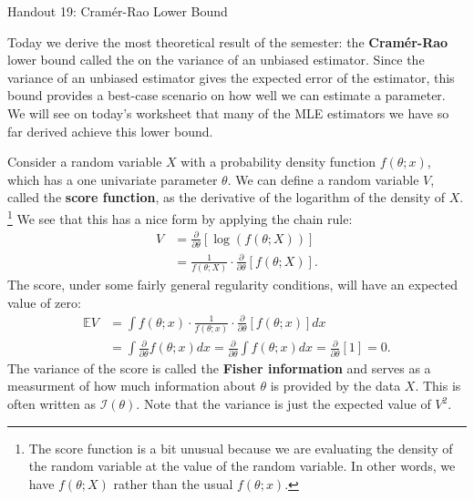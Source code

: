 \documentclass{tufte-handout}
\begin{document}
\justify

{\LARGE Handout 19: Cramér-Rao Lower Bound}

\vspace*{18pt}

\noindent
Today we derive the most theoretical result of the semester: the
\textbf{Cramér-Rao} lower bound called the on the variance of an
unbiased estimator. Since the variance of an unbiased estimator
gives the expected error of the estimator, this bound provides a
best-case scenario on how well we can estimate a parameter. We
will see on today's worksheet that many of the MLE estimators we
have so far derived achieve this lower bound.

Consider a random variable $X$ with a probability density function 
$f(\theta; x)$, which has a one univariate parameter $\theta$. We
can define a random variable $V$, called the \textbf{score function},
as the derivative of the logarithm of the density of $X$. \footnote{
  The score function is a bit unusual because we are evaluating the
  density of the random variable at the value of the random variable.
  In other words, we have $f(\theta; X)$ rather than the usual $f(\theta; x)$. 
} We see that this has a nice form by applying the chain rule:
\begin{align*}
V &= \frac{\partial}{\partial \theta} \left[ \log(f(\theta; X)) \right] \\
&= \frac{1}{f(\theta; X)} \cdot \frac{\partial}{\partial \theta} \left[ f(\theta; X) \right].
\end{align*}
The score, under some fairly general regularity conditions, will have an
expected value of zero:
\begin{align*}
\mathbb{E} V &= \int f(\theta; x) \cdot \frac{1}{f(\theta; x)} \cdot \frac{\partial}{\partial \theta} \left[ f(\theta; x) \right] dx \\
&= \int \frac{\partial}{\partial \theta} f(\theta; x) dx =
\frac{\partial}{\partial \theta} \int f(\theta; x) dx = \frac{\partial}{\partial \theta} \left[1\right] = 0.
\end{align*}
The variance of the score is called the \textbf{Fisher information}
and serves as a measurment of how much information about $\theta$ is
provided by the data $X$. This is often written as $\mathcal{I}(\theta)$.
Note that the variance is just the expected value of $V^2$.
\end{document}
